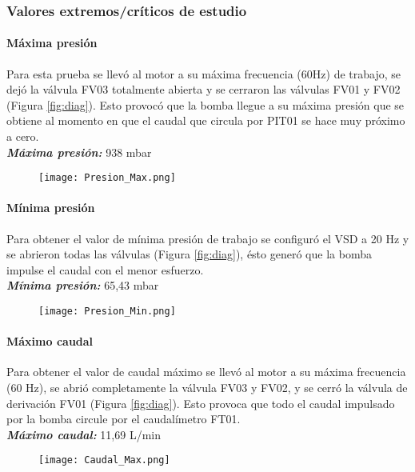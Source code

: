 {\subsubsection{Valores extremos/críticos de estudio}

\paragraph{Máxima presión}

Para esta prueba se llevó al motor a su máxima frecuencia (60Hz) de trabajo, se dejó la válvula FV03 totalmente abierta y se cerraron las válvulas FV01 y FV02 (Figura  \ref{fig:diag}). Esto provocó que la bomba llegue a su máxima presión que se obtiene al momento en que el caudal que circula por PIT01 se hace muy próximo a cero.\\
\textbf{\textit{Máxima presión:}} 938 mbar
\begin{figure}[h!]
	\centering
	\texttt{[image: Presion\_Max.png]}
	\label{fig:PMAX}
\end{figure}

\paragraph{Mínima presión}
Para obtener el valor de mínima presión de trabajo se configuró el VSD a 20 Hz y se abrieron todas las válvulas (Figura  \ref{fig:diag}), ésto generó que la bomba impulse el caudal con el menor esfuerzo. \\
\textbf{\textit{Mínima presión:}} 65,43 mbar
\begin{figure}[h!]
	\centering
	\texttt{[image: Presion\_Min.png]}
	\label{fig:Pmin}
\end{figure}

\paragraph{Máximo caudal}
Para obtener el valor de caudal máximo se llevó al motor a su máxima frecuencia (60 Hz), se abrió completamente la válvula FV03 y FV02, y se cerró la válvula de derivación FV01 (Figura  \ref{fig:diag}).
Esto provoca que todo el caudal impulsado por la bomba circule por el caudalímetro FT01.\\
\textbf{\textit{Máximo caudal: }}11,69 L/min
\begin{figure}[h!]
	\centering
	\texttt{[image: Caudal\_Max.png]}
	\label{fig:CM}
\end{figure}




}
